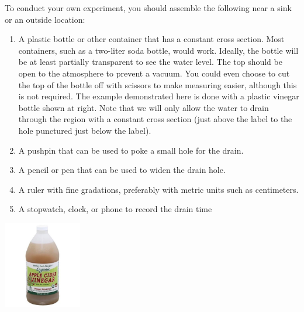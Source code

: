\documentclass{ximera}
\begin{document}
To conduct your own experiment, you should assemble the following near a sink or an outside location:
\begin{enumerate}
\item
A plastic bottle or other container that has a constant cross section.  Most containers, such as a two-liter soda bottle, would work. Ideally, the bottle will be at least partially transparent to see the water level.  The top should be open to the atmosphere to prevent a vacuum.  You could even choose to cut the top of the bottle off with scissors to make measuring easier, although this is not required.  The example demonstrated here is done with a plastic vinegar bottle shown at right.  Note that we will only allow the water to drain through the region with a constant cross section (just above the label to the hole punctured just below the label).
\item
A pushpin that can be used to poke a small hole for the drain.
\item
A pencil or pen that can be used to widen the drain hole.
\item
A ruler with fine gradations, preferably with metric units such as centimeters.
\item
A stopwatch, clock, or phone to record the drain time
\end{enumerate}
 
\begin{image}
 \includegraphics[height=1.5in]{appleCider.jpg}
\end{image}
 
\end{document}
